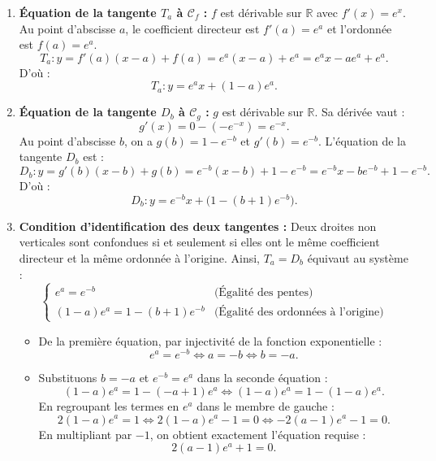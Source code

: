 \documentclass[11pt,a4paper]{article}
\newcommand{\R}{\mathbb{R}}
\begin{document}
\begin{correctionbox}[Exercice 6]
\begin{enumerate}[label=\textbf{\arabic*.}]
    \item \textbf{Équation de la tangente $T_a$ à $\mathcal{C}_f$ :}
    $f$ est dérivable sur $\R$ avec $f'(x) = e^x$.
    Au point d'abscisse $a$, le coefficient directeur est $f'(a) = e^a$ et l'ordonnée est $f(a) = e^a$.
    \[
    T_a : y = f'(a)(x - a) + f(a) = e^a(x - a) + e^a = e^a x - a e^a + e^a.
    \]
    D'où :
    \[
    \boxed{T_a : y = e^a x + (1 - a)e^a}.
    \]

    \item \textbf{Équation de la tangente $D_b$ à $\mathcal{C}_g$ :}
    $g$ est dérivable sur $\R$. Sa dérivée vaut :
    \[
    g'(x) = 0 - (-e^{-x}) = e^{-x}.
    \]
    Au point d'abscisse $b$, on a $g(b) = 1 - e^{-b}$ et $g'(b) = e^{-b}$. L'équation de la tangente $D_b$ est :
    \[
    D_b : y = g'(b)(x - b) + g(b) = e^{-b}(x - b) + 1 - e^{-b} = e^{-b} x - b e^{-b} + 1 - e^{-b}.
    \]
    D'où :
    \[
    \boxed{D_b : y = e^{-b} x + \bigl(1 - (b+1)e^{-b}\bigr)}.
    \]

    \item \textbf{Condition d'identification des deux tangentes :}
    Deux droites non verticales sont confondues si et seulement si elles ont le même coefficient directeur et la même ordonnée à l'origine. Ainsi, $T_a = D_b$ équivaut au système :
    \[
    \begin{cases}
    e^a = e^{-b} & \text{(Égalité des pentes)} \\
    (1 - a)e^a = 1 - (b+1)e^{-b} & \text{(Égalité des ordonnées à l'origine)}
    \end{cases}
    \]
    \begin{itemize}
        \item De la première équation, par injectivité de la fonction exponentielle :
        \[
        e^a = e^{-b} \iff a = -b \iff b = -a.
        \]
        \item Substituons $b = -a$ et $e^{-b} = e^a$ dans la seconde équation :
        \[
        (1 - a)e^a = 1 - (-a + 1)e^a \iff (1 - a)e^a = 1 - (1 - a)e^a.
        \]
        En regroupant les termes en $e^a$ dans le membre de gauche :
        \[
        2(1 - a)e^a = 1 \iff 2(1 - a)e^a - 1 = 0 \iff -2(a - 1)e^a - 1 = 0.
        \]
        En multipliant par $-1$, on obtient exactement l'équation requise :
        \[
        \boxed{2(a - 1)e^a + 1 = 0}.
        \]
    \end{itemize}


\end{enumerate}
\end{correctionbox}
\end{document}
